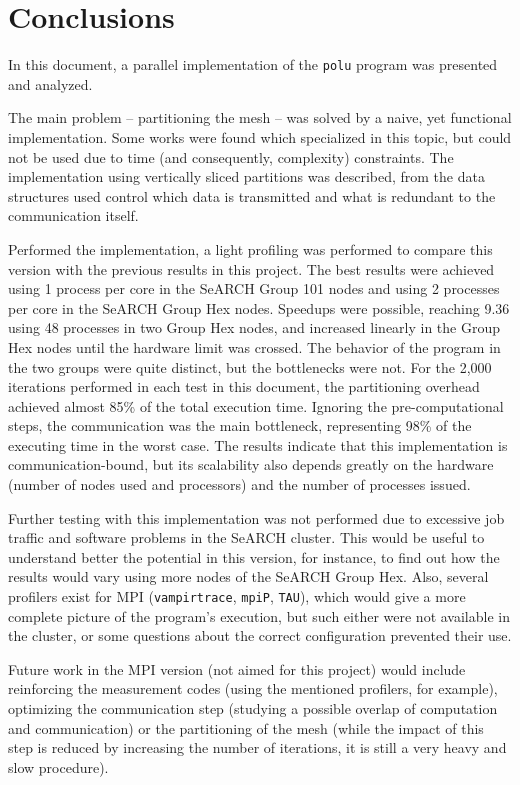 \section{Conclusions}
\label{sec:conclusions}

In this document, a parallel implementation of the \texttt{polu} program was presented and analyzed.

The main problem -- partitioning the mesh -- was solved by a naive, yet functional implementation. Some works were found which specialized in this topic, but could not be used due to time (and consequently, complexity) constraints. The implementation using vertically sliced partitions was described, from the data structures used control which data is transmitted and what is redundant to the communication itself.

Performed the implementation, a light profiling was performed to compare this version with the previous results in this project. The best results were achieved using 1 process per core in the SeARCH Group 101 nodes and using 2 processes per core in the SeARCH Group Hex nodes. Speedups were possible, reaching 9.36 using 48 processes in two Group Hex nodes, and increased linearly in the Group Hex nodes until the hardware limit was crossed. The behavior of the program in the two groups were quite distinct, but the bottlenecks were not. For the 2,000 iterations performed in each test in this document, the partitioning overhead achieved almost 85\% of the total execution time. Ignoring the pre-computational steps, the communication was the main bottleneck, representing 98\% of the executing time in the worst case. The results indicate that this implementation is communication-bound, but its scalability also depends greatly on the hardware (number of nodes used and processors) and the number of processes issued.

Further testing with this implementation was not performed due to excessive job traffic and software problems in the SeARCH cluster. This would be useful to understand better the potential in this version, for instance, to find out how the results would vary using more nodes of the SeARCH Group Hex. Also, several profilers exist for MPI (\texttt{vampirtrace}, \texttt{mpiP}, \texttt{TAU}), which would give a more complete picture of the program's execution, but such either were not available in the cluster, or some questions about the correct configuration prevented their use.

Future work in the MPI version (not aimed for this project) would include reinforcing the measurement codes (using the mentioned profilers, for example), optimizing the communication step (studying a possible overlap of computation and communication) or the partitioning of the mesh (while the impact of this step is reduced by increasing the number of iterations, it is still a very heavy and slow procedure).
